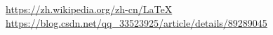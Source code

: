 \pagestyle{reference}
\begin{thebibliography}{99} %
    \setlength{\itemsep}{0.5em} %
 \url{https://zh.wikipedia.org/zh-cn/LaTeX}
 \url{https://blog.csdn.net/qq_33523925/article/details/89289045}



\end{thebibliography}
    \cleardoublepage %
 